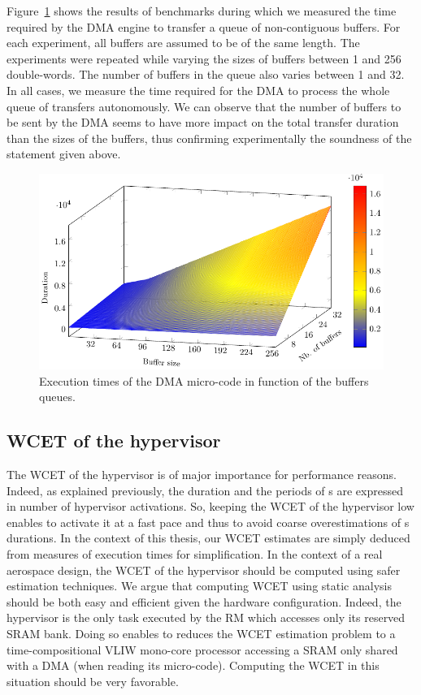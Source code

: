 \documentclass[main.tex]{subfiles}
\begin{document}
\begin{description}
        Figure~\ref{fig_implemExecModel_hvETs} shows the results of benchmarks during which we measured the time required by the DMA engine to transfer a queue of non-contiguous buffers. For each experiment, all buffers are assumed to be of the same length. The experiments were repeated while varying the sizes of buffers between 1 and 256 double-words. The number of buffers in the queue also varies between 1 and 32. In all cases, we measure the time required for the DMA to process the whole queue of transfers autonomously. We can observe that the number of buffers to be sent by the DMA seems to have more impact on the total transfer duration than the sizes of the buffers, thus confirming experimentally the soundness of the statement given above.
\begin{figure}
    \centering
    \includegraphics{imgs/pdf/implemExecModel_hvETs.pdf}
    \caption{Execution times of the DMA micro-code in function of the buffers queues.}
    \label{fig_implemExecModel_hvETs}
\end{figure}
\end{description}

\subsection{WCET of the hypervisor}
\label{ssection_implemExecModel_systick}
The WCET of the hypervisor is of major importance for performance reasons. Indeed, as explained previously, the duration and the periods of \PC{}s are expressed in number of hypervisor activations. So, keeping the WCET of the hypervisor low enables to activate it at a fast pace and thus to avoid coarse overestimations of \PC{}s durations. In the context of this thesis, our WCET estimates are simply deduced from measures of execution times for simplification. In the context of a real aerospace design, the WCET of the hypervisor should be computed using safer estimation techniques. We argue that computing WCET using static analysis should be both easy and efficient given the hardware configuration. Indeed, the hypervisor is the only task executed by the RM which accesses only its reserved SRAM bank. Doing so enables to reduces the WCET estimation problem to a time-compositional VLIW mono-core processor accessing a SRAM only shared with a DMA (when reading its micro-code). Computing the WCET in this situation should be very favorable.
\end{document}
